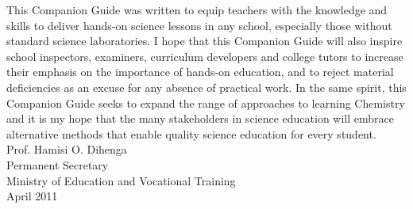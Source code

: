 This Companion Guide was written to equip teachers with the knowledge and skills to deliver hands-on science lessons in any school, especially those without standard science laboratories. I hope that this Companion Guide will also inspire school inspectors, examiners, curriculum developers and college tutors to increase their emphasis on the importance of hands-on education, and to reject material deficiencies as an excuse for any absence of practical work. In the same spirit, this Companion Guide seeks to expand the range of approaches to learning Chemistry and it is my hope that the many stakeholders in science education will embrace alternative methods that enable quality science education for every student.\\[80pt]
Prof. Hamisi O. Dihenga\\
Permanent Secretary\\
Ministry of Education and Vocational Training\\
April 2011
